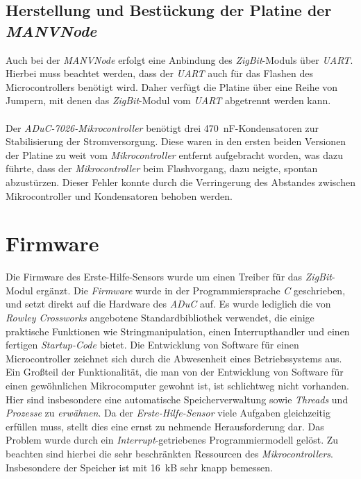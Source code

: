 \subsection{Herstellung und Bestückung der Platine der \emph{MANVNode}}
Auch bei der \emph{MANVNode} erfolgt eine Anbindung des \emph{ZigBit}-Moduls über \emph{UART}. Hierbei muss
beachtet werden, dass der \emph{UART} auch für das Flashen des Microcontrollers benötigt wird. Daher verfügt
die Platine über eine Reihe von Jumpern, mit denen das \emph{ZigBit}-Modul vom \emph{UART} abgetrennt werden
kann.\\
        \\
Der \emph{ADuC-7026-Mikrocontroller} benötigt drei 470~nF-Kondensatoren zur Stabilisierung der
Stromversorgung. Diese waren in den ersten beiden Versionen der Platine zu weit vom \emph{Mikrocontroller} entfernt 
aufgebracht worden, was dazu führte, dass der \emph{Mikrocontroller} beim Flashvorgang, dazu neigte, spontan 
abzustürzen. Dieser Fehler konnte durch die Verringerung des Abstandes zwischen Mikrocontroller und 
Kondensatoren behoben werden.


\section{Firmware}
Die Firmware des Erste-Hilfe-Sensors wurde um einen Treiber für das \emph{ZigBit}-Modul ergänzt. Die \emph{Firmware}
wurde in der Programmiersprache \emph{C} geschrieben, und setzt direkt auf die Hardware des \emph{ADuC} auf. Es wurde 
lediglich die von \emph{Rowley Crossworks} angebotene Standardbibliothek verwendet, die einige praktische Funktionen wie
Stringmanipulation, einen Interrupthandler und einen fertigen \emph{Startup-Code} bietet.
Die Entwicklung von Software für einen Microcontroller zeichnet sich durch die Abwesenheit eines Betriebssystems 
aus. Ein Großteil der Funktionalität, die man von der Entwicklung von Software für einen gewöhnlichen Mikrocomputer 
gewohnt ist, ist schlichtweg nicht vorhanden. Hier sind insbesondere eine automatische Speicherverwaltung sowie
\emph{Threads} und \emph{Prozesse} zu \emph{erwähnen}. Da der \emph{Erste-Hilfe-Sensor} viele Aufgaben gleichzeitig 
erfüllen muss, stellt dies eine ernst zu nehmende Herausforderung dar. Das Problem wurde durch ein
\emph{Interrupt}-getriebenes Programmiermodell gelöst. Zu beachten sind hierbei die sehr beschränkten Ressourcen
des \emph{Mikrocontrollers}. Insbesondere der Speicher ist mit 16~kB sehr knapp bemessen. 

